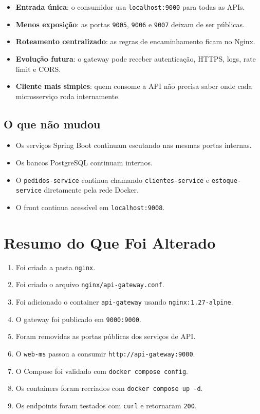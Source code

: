 \documentclass[12pt,a4paper]{article}
\begin{document}
\begin{itemize}[leftmargin=1.5em]
  \item \textbf{Entrada \'unica}: o consumidor usa \texttt{localhost:9000} para todas as APIs.
  \item \textbf{Menos exposi\c{c}\~ao}: as portas \texttt{9005}, \texttt{9006} e \texttt{9007} deixam de ser p\'ublicas.
  \item \textbf{Roteamento centralizado}: as regras de encaminhamento ficam no Nginx.
  \item \textbf{Evolu\c{c}\~ao futura}: o gateway pode receber autentica\c{c}\~ao, HTTPS, logs, rate limit e CORS.
  \item \textbf{Cliente mais simples}: quem consome a API n\~ao precisa saber onde cada microsservi\c{c}o roda internamente.
\end{itemize}

\subsection{O que n\~ao mudou}

\begin{itemize}[leftmargin=1.5em]
  \item Os servi\c{c}os Spring Boot continuam escutando nas mesmas portas internas.
  \item Os bancos PostgreSQL continuam internos.
  \item O \texttt{pedidos-service} continua chamando \texttt{clientes-service} e \texttt{estoque-service} diretamente pela rede Docker.
  \item O front continua acess\'ivel em \texttt{localhost:9008}.
\end{itemize}


\section{Resumo do Que Foi Alterado}

\begin{enumerate}[leftmargin=2em]
  \item Foi criada a pasta \texttt{nginx}.
  \item Foi criado o arquivo \texttt{nginx/api-gateway.conf}.
  \item Foi adicionado o container \texttt{api-gateway} usando \texttt{nginx:1.27-alpine}.
  \item O gateway foi publicado em \texttt{9000:9000}.
  \item Foram removidas as portas p\'ublicas dos servi\c{c}os de API.
  \item O \texttt{web-ms} passou a consumir \texttt{http://api-gateway:9000}.
  \item O Compose foi validado com \texttt{docker compose config}.
  \item Os containers foram recriados com \texttt{docker compose up -d}.
  \item Os endpoints foram testados com \texttt{curl} e retornaram \texttt{200}.
\end{enumerate}
\end{document}
